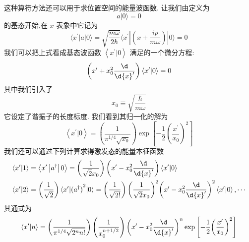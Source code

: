 \documentclass[lang=cn,newtx,10pt,scheme=chinese,thmcnt=section]{elegantbook}
\begin{document}
这种算符方法还可以用于求位置空间的能量波函数. 让我们由定义为
\begin{equation}
	a | 0\rangle = 0
\end{equation}
的基态开始,在 $x$ 表象中它记为
\begin{equation}
	\langle {{x}^{\prime }\left| a\right| 0}\rangle = \sqrt{\frac{m\omega }{2\hbar }}\langle {{x}^{\prime }| \left( {x + \frac{ip}{m\omega }}\right) | 0}\rangle = 0
\end{equation}
我们可以把上式看成基态波函数 $\left\langle {{x}^\prime|0}\right\rangle$ 满足的一个微分方程:
\begin{equation}
	\left( {{x}^{\prime } + {x}_{0}^{2}\frac{\d}{\d{x}^{\prime }}}\right) \left\langle {{x}^{\prime } | 0}\right\rangle = 0
\end{equation}
其中我们引入了
\begin{equation}
	{x}_{0} \equiv \sqrt{\frac{\hbar }{m\omega }}
\end{equation}
它设定了谐振子的长度标度. 我们看到其归一化的解为
\begin{equation}
	\left\langle {{x}^{\prime } | 0}\right\rangle = \left( \frac{1}{{\pi }^{1/4}\sqrt{{x}_{0}}}\right) \exp \left\lbrack {-\frac{1}{2}{\left( \frac{{x}^{\prime }}{{x}_{0}}\right) }^{2}}\right\rbrack
\end{equation}
我们还可以通过下列计算求得激发态的能量本征函数
\begin{equation}
	\begin{aligned}
		\left\langle {{x}^{\prime } | 1}\right\rangle &= \left\langle {{x}^{\prime }\left| {a}^{ \dagger }\right| 0}\right\rangle = \left( \frac{1}{\sqrt{2}{x}_{0}}\right) \left( {{x}^{\prime } - {x}_{0}^{2}\frac{\d}{\d{x}^{\prime }}}\right) \left\langle {{x}^{\prime } | 0}\right\rangle\\
		\left\langle {{x}^{\prime } | 2}\right\rangle &= \left( \frac{1}{\sqrt{2}}\right) \langle {{x}^{\prime }| {( {a}^{ \dagger }) }^{2}| 0}\rangle = \left( \frac{1}{\sqrt{2!}}\right) {\left( \frac{1}{\sqrt{2}{x}_{0}}\right) }^{2}{\left( {x}^{\prime } - {x}_{0}^{2}\frac{\d}{\d{x}^{\prime }}\right) }^{2}\left\langle {{x}^{\prime } | 0}\right\rangle ,\cdots
	\end{aligned}
\end{equation}
其通式为
\begin{equation}
	\left\langle {{x}^{\prime } | n}\right\rangle = \left( \frac{1}{{\pi }^{1/4}\sqrt{{2}^{n}n!}}\right) \left( \frac{1}{{x}_{0}^{n + 1/2}}\right) {\left( {x}^{\prime } - {x}_{0}^{2}\frac{\d}{\d{x}^{\prime }}\right) }^{n}\exp \left\lbrack {-\frac{1}{2}{\left( \frac{{x}^{\prime }}{{x}_{0}}\right) }^{2}}\right\rbrack
\end{equation}
\end{document}
